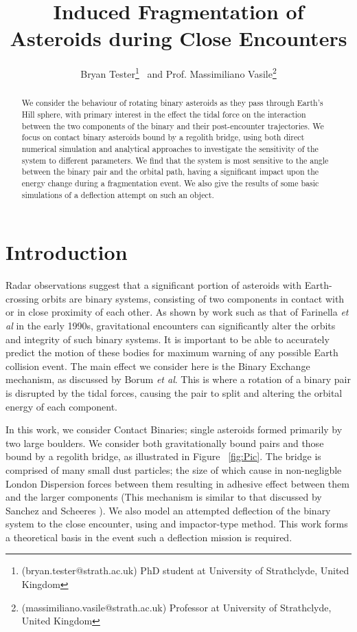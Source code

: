 \documentclass[letterpaper, preprint, paper,11pt]{AAS}	%
\begin{document}
\title{\textsf{\textbf{Induced Fragmentation of Asteroids during Close Encounters}}}
\author{\textsf{Bryan Tester}\thanks{(bryan.tester@strath.ac.uk) PhD student at University of Strathclyde, United Kingdom}
\ and \textsf{Prof. Massimiliano Vasile}\thanks{(massimiliano.vasile@strath.ac.uk) Professor at University of Strathclyde, United Kingdom}}

\maketitle{} 		


\begin{abstract}
We consider the behaviour of rotating binary asteroids as they pass through Earth's Hill sphere, with primary interest in the effect the tidal force on the interaction between the two components of the binary and their post-encounter trajectories. We focus on contact binary asteroids bound by a regolith bridge, using both direct numerical simulation and analytical approaches to investigate the sensitivity of the system to different parameters. We find that the system is most sensitive to the angle between the binary pair and the orbital path, having a significant impact upon the energy change during a fragmentation event. We also give the results of some basic simulations of a deflection attempt on such an object.
\end{abstract}

\section{Introduction}
Radar observations suggest that a significant portion of asteroids with Earth-crossing orbits are binary systems, consisting of two components in contact with or in close proximity of each other. As shown by work such as that of Farinella \textit{et al} \cite{binaryevo} in the early 1990s, gravitational encounters can significantly alter the orbits and integrity of such binary systems. It is important to be able to accurately predict the motion of these bodies for maximum warning of any possible Earth collision event. The main effect we consider here is the Binary Exchange mechanism, as discussed by Borum \textit{et al}\cite{exchange}. This is where a rotation of a binary pair is disrupted by the tidal forces, causing the pair to split and altering the orbital energy of each component. 

In this work, we consider Contact Binaries; single asteroids formed primarily by two large boulders. We consider both gravitationally bound pairs and those bound by a regolith bridge, as illustrated in Figure ~\ref{fig:Pic}. The bridge is comprised of many small dust particles; the size of which cause in non-negligble London Dispersion forces between them resulting in adhesive effect between them and the larger components (This mechanism is similar to that discussed by Sanchez and Scheeres \cite{dustbound}). We also model an attempted deflection of the binary system to the close encounter, using and impactor-type method. This work forms a theoretical basis in the event such a deflection mission is required.
\end{document}
